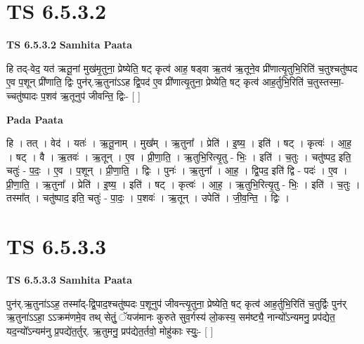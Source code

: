 \documentclass[17pt]{extarticle}
\begin{document}

\section{ TS 6.5.3.2 }

\textbf{TS 6.5.3.2 } \newline
\textbf{Samhita Paata} \newline

हि तद्-वेद॒ यत॑ ऋतू॒नां मुख॑मृ॒तुना॒ प्रेष्येति॒ षट् कृत्व॑ आह॒ षड्वा ऋ॒तव॑ ऋ॒तूने॒व प्री॑णात्यृ॒तुभि॒रिति॑ च॒तुश्चतु॑ष्पद ए॒व प॒शून् प्री॑णाति॒ द्विः पुन॑र्.ऋ॒तुना॑ऽऽह द्वि॒पद॑ ए॒व प्री॑णात्यृ॒तुना॒ प्रेष्येति॒ षट् कृत्व॑ आह॒र्तुभि॒रिति॑ च॒तुस्तस्मा॒-च्चतु॑ष्पादः प॒शव॑ ऋ॒तूनुप॑ जीवन्ति॒ द्विः- [  ] \newline

\textbf{Pada Paata} \newline

हि । तत् । वेद॑ । यतः॑ । ऋ॒तू॒नाम् । मुख᳚म् । ऋ॒तुना᳚ । प्रेति॑ । इ॒ष्य॒ । इति॑ । षट् । कृत्वः॑ । आ॒ह॒ । षट् । वै । ऋ॒तवः॑ । ऋ॒तून् । ए॒व । प्री॒णा॒ति॒ । ऋ॒तुभि॒रित्यृ॒तु - भिः॒ । इति॑ । च॒तुः । चतु॑ष्पद॒ इति॒ चतुः॑ - प॒दः॒ । ए॒व । प॒शून् । प्री॒णा॒ति॒ । द्विः । पुनः॑ । ऋ॒तुना᳚ । आ॒ह॒ । द्वि॒पद॒ इति॑ द्वि - पदः॑ । ए॒व । प्री॒णा॒ति॒ । ऋ॒तुना᳚ । प्रेति॑ । इ॒ष्य॒ । इति॑ । षट् । कृत्वः॑ । आ॒ह॒ । ऋ॒तुभि॒रित्यृ॒तु - भिः॒ । इति॑ । च॒तुः । तस्मा᳚त् । चतु॑ष्पाद॒ इति॒ चतुः॑ - पा॒दः॒ । प॒शवः॑ । ऋ॒तून् । उपेति॑ । जी॒व॒न्ति॒ । द्विः ।  \newline





\section{ TS 6.5.3.3 }

\textbf{TS 6.5.3.3 } \newline
\textbf{Samhita Paata} \newline

पुन॑र्.ऋ॒तुना॑ऽऽह॒ तस्मा᳚द्-द्वि॒पाद॒श्चतु॑ष्पदः प॒शूनुप॑ जीवन्त्यृ॒तुना॒ प्रेष्येति॒ षट् कृत्व॑ आह॒र्तुभि॒रिति॑ च॒तुर्द्विः पुन॑र् ऋ॒तुना॑ऽऽहा॒ ऽऽक्रम॑णमे॒व तथ् सेतुं॒ ॅयज॑मानः कुरुते सुव॒र्गस्य॑ लो॒कस्य॒ सम॑ष्ट्यै॒ नान्यो᳚ऽन्यमनु॒ प्रप॑द्येत॒ यद॒न्यो᳚ऽन्यम॑नु प्र॒पद्ये॑त॒र्तुर्. ऋ॒तुमनु॒ प्रप॑द्येत॒र्तवो॒ मोहु॑काः स्युः॒- [  ] \newline
\end{document}
